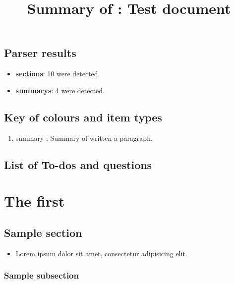 \title{Summary of : Test document}
\maketitle

\section{Parser results}
    \begin{itemize}[noitemsep]
\item \textbf{sections}: 10 were detected.
\item \textbf{summarys}: 4 were detected.
    \end{itemize}

\section{Key of colours and item types}
    \begin{enumerate}[noitemsep]
        \item summary : Summary of written a paragraph.
    \end{enumerate}

\section{List of To-dos and questions}
\vspace{-36pt}\hspace{11pt}

\chapter{The first}
\label{autosec:0}
\vspace{-36pt}\hspace{11pt}
\section{Sample section}
\label{autosec:1}
    \begin{itemize}[noitemsep]
        \item Lorem ipsum dolor sit amet, consectetur adipisicing elit.
    \end{itemize}
\subsection{Sample subsection}
\label{autosec:2}
\vspace{-36pt}\hspace{11pt}
